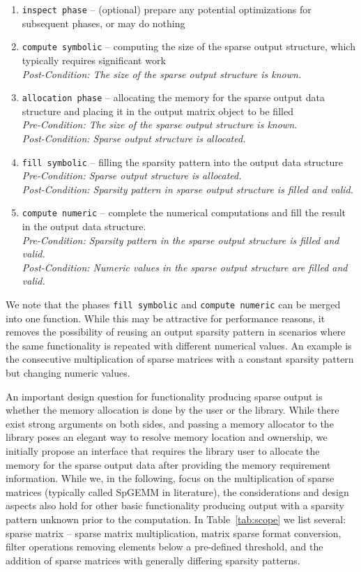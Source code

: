 \documentclass{article}
\begin{document}
\begin{enumerate}
    \item \texttt{inspect phase} -- (optional) prepare any potential optimizations for subsequent phases, or may do nothing
    \item \texttt{compute symbolic} -- computing the size of the sparse output structure, which typically requires significant work\\
    \textit{Post-Condition: The size of the sparse output structure is known.}
    \item \texttt{allocation phase} -- allocating the memory for the sparse output data structure and placing it in the output matrix object to be filled\\
    \textit{Pre-Condition: The size of the sparse output structure is known.}\\
    \textit{Post-Condition: Sparse output structure is allocated.}
    \item \texttt{fill symbolic} -- filling the sparsity pattern into the output data structure
    \textit{Pre-Condition: Sparse output structure is allocated.}\\
    \textit{Post-Condition: Sparsity pattern in sparse output structure is filled and valid.}
    \item \texttt{compute numeric} -- complete the numerical computations and fill the result in the output data structure.\\
    \textit{Pre-Condition: Sparsity pattern in the sparse output structure is filled and valid.\\
    Post-Condition: Numeric values in the sparse output structure are filled and valid.}
\end{enumerate}

We note that the phases \texttt{fill symbolic} and \texttt{compute numeric} can be merged into one function. While this may be attractive for performance reasons, it removes the possibility of reusing an output sparsity pattern in scenarios where the same functionality is repeated with different numerical values. An example is the consecutive multiplication of sparse matrices with a constant sparsity pattern but changing numeric values.

An important design question for functionality producing sparse output is whether the memory allocation is done by the user or the library. While there exist strong arguments on both sides, and passing a memory allocator to the library poses an elegant way to resolve memory location and ownership, we initially propose an interface that requires the library user to allocate the memory for the sparse output data after providing the memory requirement information. While we, in the following, focus on the multiplication of sparse matrices (typically called SpGEMM in literature), the considerations and design aspects also hold for other basic functionality producing output with a sparsity pattern unknown prior to the computation. In Table~\ref{tab:scope} we list several: sparse matrix -- sparse matrix multiplication, matrix sparse format conversion, filter operations removing elements below a pre-defined threshold, and the addition of sparse matrices with generally differing sparsity patterns.
 
\end{document}
